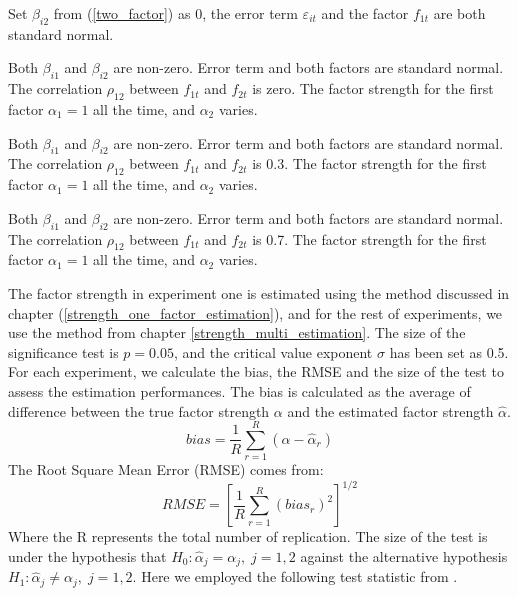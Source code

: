 \begin{experiment}
Set $\beta_{i2}$ from (\ref{two_factor}) as 0, the error term $\varepsilon_{it}$ and the factor $f_{1t}$ are both standard normal.
\end{experiment}

\begin{experiment}
Both $\beta_{i1}$ and $\beta_{i2}$ are non-zero. Error term and both factors are standard normal. The correlation $\rho_{12}$ between $f_{1t}$ and $f_{2t}$ is zero. 
The factor strength for the first factor $\alpha_1 = 1$ all the time, and $\alpha_2$ varies.
\end{experiment}

\begin{experiment}
Both $\beta_{i1}$ and $\beta_{i2}$ are non-zero. Error term  and both factors are standard normal. The correlation $\rho_{12}$ between $f_{1t}$ and $f_{2t}$ is 0.3.
The factor strength for the first factor $\alpha_1 = 1$ all the time, and $\alpha_2$ varies.
\end{experiment}

\begin{experiment}
	Both $\beta_{i1}$ and $\beta_{i2}$ are non-zero. Error term and both factors are standard normal. The correlation $\rho_{12}$ between $f_{1t}$ and $f_{2t}$ is 0.7.
	The factor strength for the first factor $\alpha_1 = 1$ all the time, and $\alpha_2$ varies.
\end{experiment}

The factor strength in experiment one is estimated using the method discussed in chapter (\ref{strength_one_factor_estimation}), and for the rest of experiments, we use the method from chapter \ref{strength_multi_estimation}.
The size of the significance test is $p = 0.05$, and the critical value exponent $\sigma$ has been set as 0.5.
For each experiment, we calculate the bias, the RMSE and the size of the test to assess the estimation performances.
The bias is calculated as the average of difference between the true factor strength $\alpha$ and the estimated factor strength $\hat{\alpha}$.
\[bias = \frac{1}{R}\sum_{r = 1}^R(\alpha - \hat{\alpha}_r)\]
The Root Square Mean Error (RMSE) comes from:
\[ RMSE =[\frac{1}{R}\sum_{r=1}^{R}(bias_r)^2 ]^{1/2}\]
Where the R represents the total number of replication.
The size of the test is under the hypothesis that $H_0: \hat{\alpha}_j = \alpha_j,\;j =1, 2$ against the alternative hypothesis $H_1:\hat{\alpha}_j \neq \alpha_j,\; j=1,2$.
Here we employed the following test statistic from .

